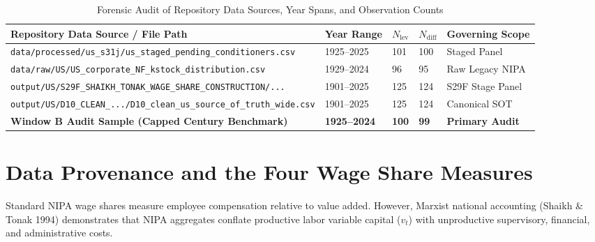 \documentclass[11pt,a4paper]{article}
\begin{document}
\begin{table}[h!]
\centering
\small
\caption{Forensic Audit of Repository Data Sources, Year Spans, and Observation Counts}
\label{tab:sample_audit}
\begin{tabular}{p{6.8cm} p{2.2cm} p{1.6cm} p{1.6cm} p{2.2cm}}
\toprule
\textbf{Repository Data Source / File Path} & \textbf{Year Range} & \textbf{$N_{\text{lev}}$} & \textbf{$N_{\text{diff}}$} & \textbf{Governing Scope} \\
\midrule
\texttt{data/processed/us\_s31j/us\_staged\_pending\_conditioners.csv} & 1925--2025 & 101 & 100 & Staged Panel \\
\texttt{data/raw/US/US\_corporate\_NF\_kstock\_distribution.csv} & 1929--2024 & 96 & 95 & Raw Legacy NIPA \\
\texttt{output/US/S29F\_SHAIKH\_TONAK\_WAGE\_SHARE\_CONSTRUCTION/...} & 1901--2025 & 125 & 124 & S29F Stage Panel \\
\texttt{output/US/D10\_CLEAN\_.../D10\_clean\_us\_source\_of\_truth\_wide.csv} & 1901--2025 & 125 & 124 & Canonical SOT \\
\textbf{Window B Audit Sample (Capped Century Benchmark)} & \textbf{1925--2024} & \textbf{100} & \textbf{99} & \textbf{Primary Audit} \\
\bottomrule
\end{tabular}
\end{table}

\FloatBarrier
\section{Data Provenance and the Four Wage Share Measures}

Standard NIPA wage shares measure employee compensation relative to value added. However, Marxist national accounting (Shaikh \& Tonak 1994) demonstrates that NIPA aggregates conflate productive labor variable capital ($v_t$) with unproductive supervisory, financial, and administrative costs.
\end{document}
